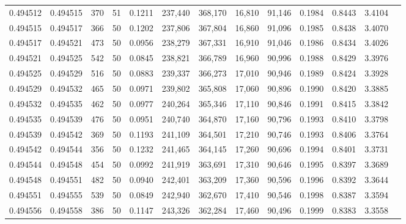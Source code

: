 \begin{tabular}{rrrrrrrrrrrrr}
0.494512 & 0.494515 &   370 &  51 &                                     0.1211 & 237,440 & 368,170 &  16,810 &  91,146 & 0.1984 & 0.8443 & 3.4104 \\
0.494515 & 0.494517 &   366 &  50 &                                     0.1202 & 237,806 & 367,804 &  16,860 &  91,096 & 0.1985 & 0.8438 & 3.4070 \\
0.494517 & 0.494521 &   473 &  50 &                                     0.0956 & 238,279 & 367,331 &  16,910 &  91,046 & 0.1986 & 0.8434 & 3.4026 \\
0.494521 & 0.494525 &   542 &  50 &                                     0.0845 & 238,821 & 366,789 &  16,960 &  90,996 & 0.1988 & 0.8429 & 3.3976 \\
0.494525 & 0.494529 &   516 &  50 &                                     0.0883 & 239,337 & 366,273 &  17,010 &  90,946 & 0.1989 & 0.8424 & 3.3928 \\
0.494529 & 0.494532 &   465 &  50 &                                     0.0971 & 239,802 & 365,808 &  17,060 &  90,896 & 0.1990 & 0.8420 & 3.3885 \\
0.494532 & 0.494535 &   462 &  50 &                                     0.0977 & 240,264 & 365,346 &  17,110 &  90,846 & 0.1991 & 0.8415 & 3.3842 \\
0.494535 & 0.494539 &   476 &  50 &                                     0.0951 & 240,740 & 364,870 &  17,160 &  90,796 & 0.1993 & 0.8410 & 3.3798 \\
0.494539 & 0.494542 &   369 &  50 &                                     0.1193 & 241,109 & 364,501 &  17,210 &  90,746 & 0.1993 & 0.8406 & 3.3764 \\
0.494542 & 0.494544 &   356 &  50 &                                     0.1232 & 241,465 & 364,145 &  17,260 &  90,696 & 0.1994 & 0.8401 & 3.3731 \\
0.494544 & 0.494548 &   454 &  50 &                                     0.0992 & 241,919 & 363,691 &  17,310 &  90,646 & 0.1995 & 0.8397 & 3.3689 \\
0.494548 & 0.494551 &   482 &  50 &                                     0.0940 & 242,401 & 363,209 &  17,360 &  90,596 & 0.1996 & 0.8392 & 3.3644 \\
0.494551 & 0.494555 &   539 &  50 &                                     0.0849 & 242,940 & 362,670 &  17,410 &  90,546 & 0.1998 & 0.8387 & 3.3594 \\
0.494556 & 0.494558 &   386 &  50 &                                     0.1147 & 243,326 & 362,284 &  17,460 &  90,496 & 0.1999 & 0.8383 & 3.3558 \\

\end{tabular}
